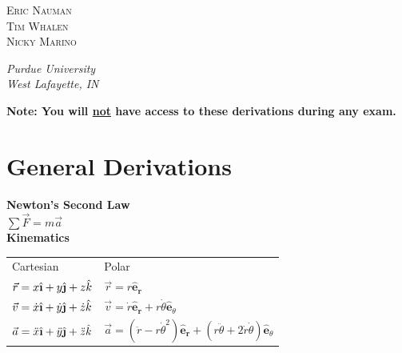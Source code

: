 \documentclass{article}
\newcommand{\ihat}{\hat{\textbf{\i}}}
\newcommand{\jhat}{\hat{\textbf{\j}}}
\newcommand{\erhat}{\hat{\textbf{e}}_\textbf{r}}
\newcommand{\ethat}{\hat{\textbf{e}}_\textbf{$\theta$}}
\begin{document}
\begin{titlepage}
    \vspace{0.5\baselineskip} %
    
    {\scshape\Large Eric Nauman \\ Tim Whalen \\ Nicky Marino \\} %
    
    \vspace{0.5\baselineskip} %
    
    \textit{Purdue University \\ West Lafayette, IN} %
    
    \vfill %
    
    
    \vspace{1\baselineskip}
    
    \textbf{Note: You will \underline{not} have access to these derivations during any exam.}

\end{titlepage}


\section*{General Derivations}

\textbf{Newton's Second Law} \\
$\sum \vec{F} = m \vec{a}$ \\

\textbf{Kinematics} \\
\begin{tabular} {@{} ll }
    Cartesian                                                       & Polar \\
    $\vec{r} = x\ihat + y\jhat + z\hat{k}$                      & $\vec{r} = r\erhat$ \\
    $\vec{v} = \dot{x}\ihat + \dot{y}\jhat + \dot{z}\hat{k}$    & $\vec{v} = \dot{r}\erhat + r\dot{\theta}\ethat$ \\
    $\vec{a} = \ddot{x}\ihat + \ddot{y}\jhat + \ddot{z}\hat{k}$ & $\vec{a} = (\ddot{r} - r\dot{\theta}^2) \erhat + (r\ddot{\theta} + 2\dot{r}\dot{\theta})\ethat$
\end{tabular} \\
\end{document}
